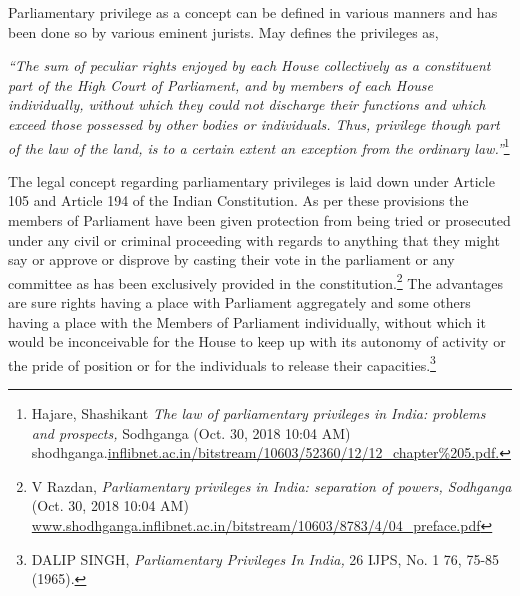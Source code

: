 \setcounter{figure}{0}
\setcounter{table}{0}
\setcounter{footnote}{0}


\begin{multicols}{2}


\noi
Parliamentary privilege as a concept can be defined in various manners and has been done so
by various eminent jurists. May defines the privileges as,

\noi
\begin{quoting}
\textit{“The sum of peculiar rights enjoyed by each House collectively as a constituent part
of the High Court of Parliament, and by members of each House individually, without
which they could not discharge their functions and which exceed those possessed by
other bodies or individuals. Thus, privilege though part of the law of the land, is to a
certain extent an exception from the ordinary law.”}\footnote{Hajare, Shashikant \textit{The law of parliamentary privileges in India: problems and prospects,} Sodhganga (Oct. 30, 2018 10:04 AM)  shodhganga.\url{inflibnet.ac.in/bitstream/10603/52360/12/12_chapter\%205.pdf.}}
\end{quoting}

\noi
The legal concept regarding parliamentary privileges is laid down under Article 105 and
Article 194 of the Indian Constitution. As per these provisions the members of Parliament
have been given protection from being tried or prosecuted under any civil or criminal
proceeding with regards to anything that they might say or approve or disprove by casting
their vote in the parliament or any committee as has been exclusively provided in the
constitution.\footnote{V Razdan, \textit{Parliamentary privileges in India: separation of powers, Sodhganga} (Oct. 30, 2018 10:04 AM) \url{www.shodhganga.inflibnet.ac.in/bitstream/10603/8783/4/04_preface.pdf}} The advantages are sure rights having a place with Parliament aggregately and some others having a place with the Members of Parliament individually, without which it would be inconceivable for the House to keep up with its autonomy of activity or the pride of
position or for the individuals to release their capacities.\footnote{DALIP SINGH, \textit{Parliamentary Privileges In India,} 26 IJPS, No. 1 76, 75-85 (1965).}


\end{multicols}
